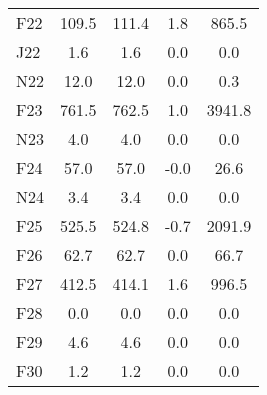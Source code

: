 \documentclass[article,crop=false]{standalone}%
\begin{document}
\begin{tabular}[h]{l | c c c c}
\rowcolor{white}%
F22&109.5&111.4&1.8&865.5\\%
\rowcolor{lightgray}%
J22&1.6&1.6&0.0&0.0\\%
\rowcolor{white}%
N22&12.0&12.0&0.0&0.3\\%
\rowcolor{lightgray}%
F23&761.5&762.5&1.0&3941.8\\%
\rowcolor{white}%
N23&4.0&4.0&0.0&0.0\\%
\rowcolor{lightgray}%
F24&57.0&57.0&{-}0.0&26.6\\%
\rowcolor{white}%
N24&3.4&3.4&0.0&0.0\\%
\rowcolor{lightgray}%
F25&525.5&524.8&{-}0.7&2091.9\\%
\rowcolor{white}%
F26&62.7&62.7&0.0&66.7\\%
\rowcolor{lightgray}%
F27&412.5&414.1&1.6&996.5\\%
\rowcolor{white}%
F28&0.0&0.0&0.0&0.0\\%
\rowcolor{lightgray}%
F29&4.6&4.6&0.0&0.0\\%
\rowcolor{white}%
F30&1.2&1.2&0.0&0.0\\%
\hline%
\end{tabular}%
\end{document}

